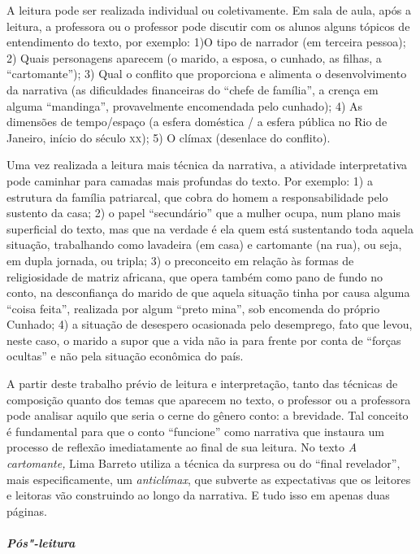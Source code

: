 \documentclass{extarticle}
\begin{document}
A leitura pode ser realizada individual ou coletivamente. Em sala de
aula, após a leitura, a professora ou o professor pode discutir com os
alunos alguns tópicos de entendimento do texto, por exemplo: 1)O tipo de
narrador (em terceira pessoa); 2) Quais personagens aparecem (o marido,
a esposa, o cunhado, as filhas, a ``cartomante''); 3) Qual o conflito
que proporciona e alimenta o desenvolvimento da narrativa (as
dificuldades financeiras do ``chefe de família'', a crença em alguma
``mandinga'', provavelmente encomendada pelo cunhado); 4) As dimensões
de tempo/espaço (a esfera doméstica / a esfera pública no Rio de
Janeiro, início do século \textsc{xx}); 5) O clímax (desenlace do conflito).

Uma vez realizada a leitura mais técnica da narrativa, a atividade
interpretativa pode caminhar para camadas mais profundas do texto. Por
exemplo: 1) a estrutura da família patriarcal, que cobra do homem a
responsabilidade pelo sustento da casa; 2) o papel ``secundário'' que a
mulher ocupa, num plano mais superficial do texto, mas que na verdade é
ela quem está sustentando toda aquela situação, trabalhando como
lavadeira (em casa) e cartomante (na rua), ou seja, em dupla jornada, ou
tripla; 3) o preconceito em relação às formas de religiosidade de matriz
africana, que opera também como pano de fundo no conto, na desconfiança
do marido de que aquela situação tinha por causa alguma ``coisa feita'',
realizada por algum ``preto mina'', sob encomenda do próprio Cunhado; 4)
a situação de desespero ocasionada pelo desemprego, fato que levou,
neste caso, o marido a supor que a vida não ia para frente por conta de
``forças ocultas'' e não pela situação econômica do país.

A partir deste trabalho prévio de leitura e interpretação, tanto das
técnicas de composição quanto dos temas que aparecem no texto, o
professor ou a professora pode analisar aquilo que seria o cerne do
gênero conto: a brevidade. Tal conceito é fundamental para que o conto
``funcione'' como narrativa que instaura um processo de reflexão
imediatamente ao final de sua leitura. No texto {\textit{A
cartomante,}} Lima Barreto utiliza a técnica da surpresa ou do ``final
revelador'', mais especificamente, um \emph{anticlímax}, que subverte as
expectativas que os leitores e leitoras vão construindo ao longo da
narrativa. E tudo isso em apenas duas páginas.

\paragraph{\textit{Pós"-leitura}}
\end{document}
